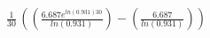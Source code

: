 \documentclass[preview]{standalone}
\begin{document}
\begin{align*}
\frac{1}{30}\,((\frac{6.687e^{ln(0.931)30}}{ln(0.931)})-(\frac{6.687}{ln(0.931)}))
\end{align*}
\end{document}
